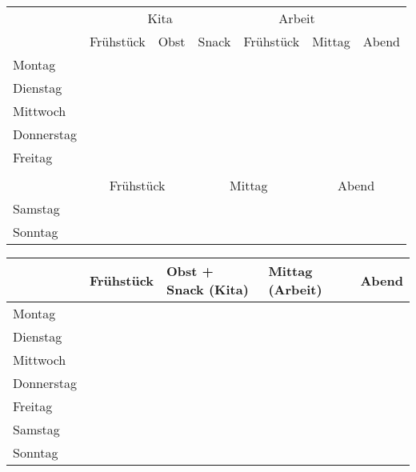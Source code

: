 \documentclass[a4paper,12pt]{article}
\begin{document}
\pagestyle{empty}

\centering

\begin{tabular}{l|p{3.2cm}|p{3.2cm}|p{3.2cm}||p{3.2cm}|p{3.2cm}||p{3.2cm}|}
  \toprule
  \multicolumn{1}{c|}{} & \multicolumn{3}{c||}{Kita} & \multicolumn{2}{c||}{Arbeit} & \\
                        & Frühstück & Obst & Snack & Frühstück & Mittag & Abend \\
  \midrule
  Montag                &           &      &       &           &        &       \\[1.3cm]
  \midrule
  Dienstag              &           &      &       &           &        &       \\[1.3cm]
  \midrule
  Mittwoch              &           &      &       &           &        &       \\[1.3cm]
  \midrule
  Donnerstag            &           &      &       &           &        &       \\[1.3cm]
  \midrule
  Freitag               &           &      &       &           &        &       \\[1.3cm]
  \bottomrule
  \multicolumn{7}{c}{} \\[0.5cm] %
  \toprule
          & \multicolumn{2}{c|}{Frühstück} & \multicolumn{2}{c|}{Mittag} & \multicolumn{2}{c|}{Abend} \\
  \midrule
  Samstag & \multicolumn{2}{c|}{}          & \multicolumn{2}{c|}{}       & \multicolumn{2}{c|}{}      \\[1.3cm]
  \midrule
  Sonntag & \multicolumn{2}{c|}{}          & \multicolumn{2}{c|}{}       & \multicolumn{2}{c|}{}      \\[1.3cm]
  \bottomrule
\end{tabular}

\begin{tabular}{l|p{4cm}|p{4cm}|p{4cm}|p{4cm}|}
  \toprule
             & Frühstück & Obst + Snack (Kita) & Mittag (Arbeit) & Abend \\
  \midrule
  Montag     &           &                     &                 &       \\[1.4cm]
  \midrule
  Dienstag   &           &                     &                 &       \\[1.4cm]
  \midrule
  Mittwoch   &           &                     &                 &       \\[1.4cm]
  \midrule
  Donnerstag &           &                     &                 &       \\[1.4cm]
  \midrule
  Freitag    &           &                     &                 &       \\[1.4cm]
  \midrule
  Samstag    &           &                     &                 &       \\[1.4cm]
  \midrule
  Sonntag    &           &                     &                 &       \\[1.4cm]
  \bottomrule
\end{tabular}
\end{document}
